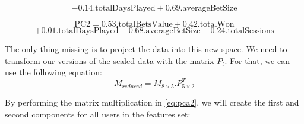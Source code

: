 \documentclass[a4,12pt,twosided,openany]{memoir}
\begin{document}
\[-0.14.\textrm{totalDaysPlayed} +  0.69.\textrm{averageBetSize} \]
\par 
\indent
\begin{equation}\label{eq:lepca3}
\textrm{PC2} = 0.53.\textrm{totalBetsValue} + 0.42 .\textrm{totalWon} 
\end{equation}
\[ + 0.01.\textrm{totalDaysPlayed}  -0.68.\textrm{averageBetSize} -0.24.\textrm{totalSessions}\]
\par 
\indent
The only thing missing is to project the data into this new space. We need to transform our versions of the scaled data with the matrix $P_t$. For that, we can use the following equation:
\begin{equation}\label{eq:pca2}
M_{reduced} = M_{8 \times 5} . P^T_{5 \times 2}
\end{equation}
\par 
\indent
By performing the matrix multiplication in \ref{eq:pca2}, we will create the first and second components for all users in the features set:
\begin{center}

\end{center}
\end{document}
